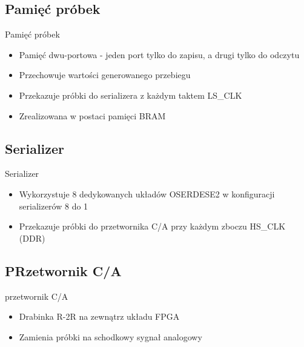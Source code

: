 \documentclass{beamer}
\begin{document}
    \subsection{Pamięć próbek}
    \begin{frame}{Pamięć próbek}
        \begin{block}{}
            \begin{itemize}
                \item Pamięć dwu-portowa - jeden port tylko do zapisu, a drugi tylko do odczytu
                \item Przechowuje wartości generowanego przebiegu
                \item Przekazuje próbki do serializera z każdym taktem LS\_CLK
                \item Zrealizowana w postaci pamięci BRAM
            \end{itemize}
        \end{block}
    \end{frame}

    \subsection{Serializer}
    \begin{frame}{Serializer}
        \begin{block}{}
            \begin{itemize}
                \item Wykorzystuje 8 dedykowanych układów OSERDESE2 w konfiguracji serializerów 8 do 1
                \item Przekazuje próbki do przetwornika C/A przy każdym zboczu HS\_CLK (DDR)
            \end{itemize}
        \end{block}
    \end{frame}

    \subsection{PRzetwornik C/A}
    \begin{frame}{przetwornik C/A}
        \begin{block}{}
            \begin{itemize}
                \item Drabinka R-2R na zewnątrz układu FPGA
                \item Zamienia próbki na schodkowy sygnał analogowy
            \end{itemize}
        \end{block}
    \end{frame}
    
\end{document}
